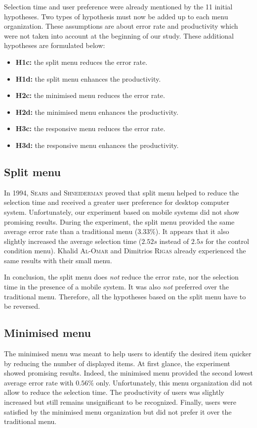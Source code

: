 Selection time and user preference were already mentioned by the 11 initial 
hypotheses. Two types of hypothesis must now be added up to each 
menu organization. These assumptions are about error rate and productivity 
which were not taken into account at the beginning of our study. These 
additional hypotheses are formulated below:

\begin{itemize}
 \item \textbf{H1c:} the split menu reduces the error rate.
 \item \textbf{H1d:} the split menu enhances the productivity.
 \item \textbf{H2c:} the minimised menu reduces the error rate.
 \item \textbf{H2d:} the minimised menu enhances the productivity.
 \item \textbf{H3c:} the responsive menu reduces the error rate.
 \item \textbf{H3d:} the responsive menu enhances the productivity.
\end{itemize}


\subsection{Split menu}
In 1994, \textsc{Sears} and \textsc{Shneiderman} proved that split menu 
helped to reduce the selection time and received a greater user preference for 
desktop computer system. Unfortunately, our experiment based on 
mobile systems did not show promising results. During the experiment, the split 
menu provided the same average error rate than a traditional menu ($3.33\%$). 
It appears that it also slightly increased the average selection time ($2.52s$ 
instead of $2.5s$ for the control condition menu). Khalid 
\textsc{Al-Omar} and Dimitrios \textsc{Rigas} already experienced the 
same results with their small menu.\newline

In conclusion, the split menu does \textit{not} reduce the error rate, nor the 
selection time in the presence of a mobile system. It was also \textit{not} 
preferred over the traditional menu. Therefore, all the hypotheses based on the 
split menu have to be reversed.

\subsection{Minimised menu}
The minimised menu was meant to help users to identify the desired item 
quicker by reducing the number of displayed items. At first glance, the 
experiment showed promising results. Indeed, the minimised menu provided the 
second lowest average error rate with $0.56\%$ only. Unfortunately, this menu 
organization did not allow to reduce the selection time. The productivity of 
users was slightly increased but still remains unsignificant to be recognized. 
Finally, users were satisfied by the minimised menu organization but did not 
prefer it over the traditional menu.\newline

